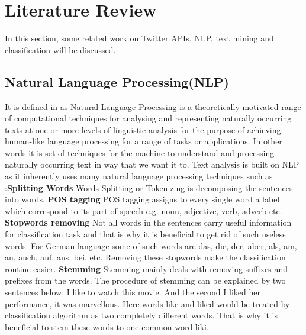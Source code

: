 \documentclass[journal]{IEEEtran}
\begin{document}
\section{Literature Review } 
\noindent In this section, some related work on Twitter APIs, NLP, text mining and classification will be discussed.
\subsection{Natural Language Processing(NLP)}
\noindent 
It is defined in as Natural Language Processing is a theoretically  motivated range of computational techniques for analysing and representing naturally occurring texts at one or more levels of linguistic analysis for the purpose of achieving human-like language processing for a range of tasks or applications\cite{rishit}. In other words it is set of techniques for the machine to understand and processing naturally occurring text in way that we want it to. Text analysis is built on NLP as it inherently uses many natural language processing techniques such as :\newline \label{key}\textbf{Splitting Words} Words Splitting or Tokenizing is decomposing the sentences into words.\newline
\textbf{POS tagging}
POS tagging assigns to every single word a label which correspond to its part of speech e.g. noun, adjective, verb, adverb etc.\newline
\textbf{Stopwords removing}
Not all words in the sentences carry useful information for classification task and that is why it is beneficial to get rid of such useless words. For German language some of such words are das, die, der, aber, als, am, an, auch, auf, aus, bei, etc. Removing these stopwords make the classification routine easier.\newline
\textbf{Stemming}
Stemming mainly deals with removing suffixes and prefixes from the words. The procedure of stemming can be explained by two sentences below. I like to watch this movie. And the second I liked her performance, it was marvellous. Here words like and liked would be treated by classification algorithm as two completely different words. That is why it is beneficial to stem these words to one common word liki.\newline
\end{document}
